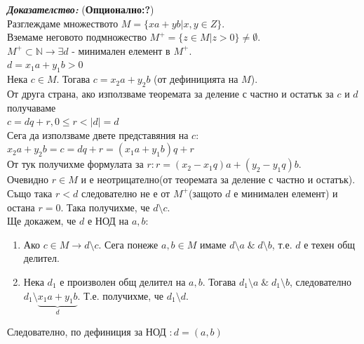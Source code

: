 \documentclass[11pt]{article} %
\newcommand{\italicBold}[1]{\textbf{\emph{#1}}}
\newcommand{\proof}{\italicBold{Доказателство: }}
\newcommand{\curlies}[1]{\{#1\}}
\newcommand{\enumNum}{\renewcommand{\theenumi}{\arabic{enumi}}}
\begin{document}
\proof (\textbf{Опционално:?})\\
Разглеждаме множеството $M = \curlies{xa + yb|x,y \in Z}$.\\
Вземаме неговото подмножество $M^{+}=\curlies{z \in M|z>0}\neq \emptyset$.\\
$M^{+}\subset \mathbb{N} \rightarrow \exists d$ - минимален елемент в $M^{+}$.\\
$d = x_{1}a+y_{1}b > 0$\\
Нека $c \in M$. Тогава $c = x_{2}a + y_{2}b$ (от дефиницията на $M$).\\
От друга страна, ако използваме теоремата за деление с частно и остатък за $c$ и $d$ получаваме\\
$c = dq+r, 0\leq r < |d| = d$\\
Сега да използваме двете представяния на $c$:\\
$x_{2}a+y_{2}b=c=dq+r=(x_{1}a+y_{1}b)q+r$\\
От тук получихме формулата за $r:r=(x_{2}-x_{1}q)a+(y_{2}-y_{1}q)b$.\\
Очевидно $r \in M$ и е неотрицателно(от теоремата за деление с частно и остатък). Също така $r < d$ следователно не е от $M^{+}$(защото $d$ е минимален елемент) и остана $r=0$. Така получихме, че $d \setminus c$.\\
Ще докажем, че $d$ е НОД на $a,b$:\\

\enumNum
\begin{enumerate}
	\item Ако $c \in M \rightarrow d \setminus c$. Сега понеже $a,b \in M$ имаме $d \setminus a \;\&\; d \setminus b$, т.е. $d$ е техен общ делител.\\
	\item Нека $d_{1}$ е произволен общ делител на $a,b$. Тогава $d_{1} \setminus a \;\&\; d_{1} \setminus b$, следователно $d_{1} \setminus \underbrace{x_{1}a+y_{1}b}_{d} $. Т.е. получихме, че $d_{1} \setminus d$. \\ 
\end{enumerate}
Следователно, по дефиниция за НОД $: d = (a,b)$
\end{document}
